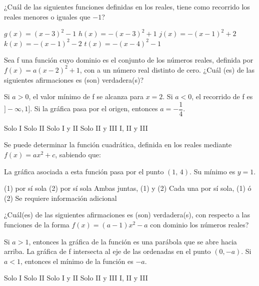 \documentclass[sin nombre]{srs}
\begin{document}
\begin{preguntas}[after-item-skip=2cm]
\pregunta ¿Cuál de las siguientes funciones definidas en los reales, tiene como recorrido los reales menores o iguales que $-1$?
\begin{vertical}
\alternativa $g\left(x\right) = \left(x - 3\right)^{2} - 1$
\alternativa $h\left(x\right) = -\left(x - 3\right)^{2} + 1$
\alternativa $j\left(x\right) = -\left(x - 1\right)^{2} + 2$
\alternativa $k\left(x\right) = -\left(x - 1\right)^{2} - 2$
\alternativa $t\left(x\right) = -\left(x - 4\right)^{2} - 1$
\end{vertical}

\pregunta Sea f una función cuyo dominio es el conjunto de los números reales, definida por $f\left(x\right) = a\left(x - 2\right)^{2} + 1$, con a un número real distinto de cero. ¿Cuál (es) de las siguientes afirmaciones es (son) verdadera(s)?
\begin{verticali}
\alternativa Si $a > 0$, el valor mínimo de f se alcanza para $x = 2$.
\alternativa Si $a < 0$, el recorrido de f es $]-\infty, 1]$.
\alternativa Si la gráfica pasa por el origen, entonces $a = -\dfrac{1}{4}$.
\end{verticali}
\begin{vertical}
\alternativa Solo I
\alternativa Solo II
\alternativa Solo I y II
\alternativa Solo II y III
\alternativa I, II y III
\end{vertical}

\pregunta Se puede determinar la función cuadrática, definida en los reales mediante $f\left(x\right) = ax^{2} + c$, sabiendo que:
\begin{verticaln}
\alternativa La gráfica asociada a esta función pasa por el punto $\left(1,\,4\right)$.
\alternativa Su mínimo es $y = 1$.
\end{verticaln}
\begin{vertical}
\alternativa (1) por sí sola
\alternativa (2) por sí sola
\alternativa Ambas juntas, (1) y (2)
\alternativa Cada una por sí sola, (1) ó (2)
\alternativa Se requiere información adicional
\end{vertical}

\pregunta ¿Cuál(es) de las siguientes afirmaciones es (son) verdadera(s), con respecto a las funciones de la forma $f\left(x\right) = \left(a - 1\right)x^{2} - a$ con dominio los números reales?
\begin{verticali}
\alternativa Si $a > 1$, entonces la gráfica de la función es una parábola que se abre hacia arriba.
\alternativa La gráfica de f intersecta al eje de las ordenadas en el punto $\left(0, -a\right)$.
\alternativa Si $a < 1$, entonces el mínimo de la función es $-a$.
\end{verticali}
\begin{vertical}
\alternativa Solo I
\alternativa Solo II
\alternativa Solo I y II
\alternativa Solo II y III
\alternativa I, II y III
\end{vertical}


\end{preguntas}
\end{document}
